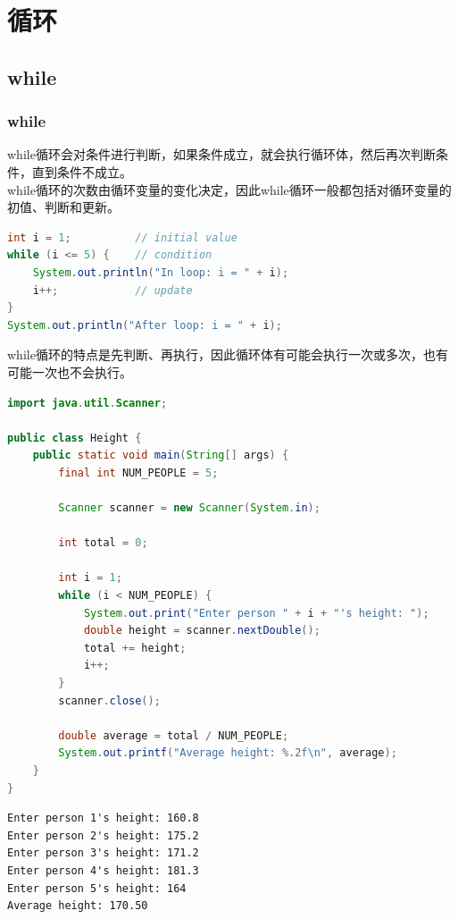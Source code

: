 \chapter{循环}

\section{while}

\subsection{while}

while循环会对条件进行判断，如果条件成立，就会执行循环体，然后再次判断条件，直到条件不成立。\\

while循环的次数由循环变量的变化决定，因此while循环一般都包括对循环变量的初值、判断和更新。

\vspace{-0.5cm}

\begin{lstlisting}[language=Java]
int i = 1;          // initial value
while (i <= 5) {    // condition
    System.out.println("In loop: i = " + i);
    i++;            // update
}
System.out.println("After loop: i = " + i);
\end{lstlisting}

while循环的特点是先判断、再执行，因此循环体有可能会执行一次或多次，也有可能一次也不会执行。\\


\begin{lstlisting}[language=Java]
import java.util.Scanner;

public class Height {
    public static void main(String[] args) {
        final int NUM_PEOPLE = 5;

        Scanner scanner = new Scanner(System.in);

        int total = 0;

        int i = 1;
        while (i < NUM_PEOPLE) {
            System.out.print("Enter person " + i + "'s height: ");
            double height = scanner.nextDouble();
            total += height;
            i++;
        }
        scanner.close();

        double average = total / NUM_PEOPLE;
        System.out.printf("Average height: %.2f\n", average);
    }
}
\end{lstlisting}

\begin{tcolorbox}
    \begin{verbatim}
Enter person 1's height: 160.8
Enter person 2's height: 175.2
Enter person 3's height: 171.2
Enter person 4's height: 181.3
Enter person 5's height: 164
Average height: 170.50
\end{verbatim}
\end{tcolorbox}

